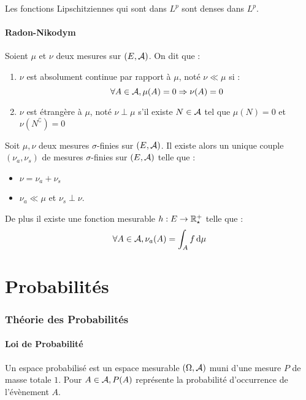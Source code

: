\documentclass{cours}
\begin{document}
        \begin{lemma}
            Les fonctions Lipschitziennes qui sont dans $L^{p}$ sont denses dans $L^{p}$.
        \end{lemma}

        \subsection{Radon-Nikodym}
        \begin{definition}
            Soient $\mu$ et $\nu$ deux mesures sur $\left(E, \mathcal{A}\right)$. On dit que :
            \begin{enumerate}
                \item $\nu$ est absolument continue par rapport à $\mu$, noté $\nu \ll \mu$ si :
                \[
                    \forall A \in \mathcal{A}, \mu(A) = 0 \Rightarrow \nu(A) = 0
                \] 
                \item $\nu$ est étrangère à $\mu$, noté $\nu \perp \mu$ s'il existe $N \in \mathcal{A}$ tel que $\mu(N) = 0$ et $\nu(N^{\complement}) = 0$
            \end{enumerate}
        \end{definition}

        \begin{theorem}
            Soit $\mu, \nu$ deux mesures $\sigma$-finies sur $\left(E, \mathcal{A}\right)$. Il existe alors un unique couple $\left(\nu_{a}, \nu_{s}\right)$ de mesures $\sigma$-finies sur $\left(E, \mathcal{A}\right)$ telle que : 
            \begin{itemize}
                \item $\nu = \nu_{a} + \nu_{s}$
                \item $\nu_{a} \ll \mu$ et $\nu_{s} \perp \nu$.
            \end{itemize}
            De plus il existe une fonction mesurable $h : E \rightarrow \mathbb{R}_{\star}^{+}$ telle que : 
            \[
                \forall A \in \mathcal{A}, \nu_{a}(A) = \int_{A}f {\rm \, d}\mu
            \]
        \end{theorem}


\part{Probabilités}
    \section{Théorie des Probabilités}
    \subsection{Loi de Probabilité}
    \begin{definition}
        Un espace probabilisé est un espace mesurable $\left(\Omega, \mathcal{A}\right)$ muni d'une mesure $P$ de masse totale $1$. Pour $A\in \mathcal{A}, P(A)$ représente la probabilité d'occurrence de l'évènement $A$. 
    \end{definition}
\end{document}

